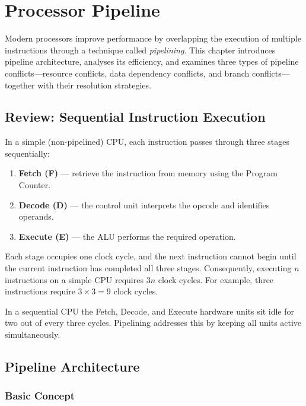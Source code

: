 \documentclass[11pt, a4paper, notitlepage]{report}
\theoremstyle{definition}
\theoremstyle{remark}
\theoremstyle{definition}
\begin{document}
\chapter{Processor Pipeline}
\label{chap:pipeline}

Modern processors improve performance by overlapping the execution of multiple instructions through a technique called \emph{pipelining}. This chapter introduces pipeline architecture, analyses its efficiency, and examines three types of pipeline conflicts---resource conflicts, data dependency conflicts, and branch conflicts---together with their resolution strategies.

\section{Review: Sequential Instruction Execution}
\label{sec:seq-execution}

In a simple (non-pipelined) CPU, each instruction passes through three stages sequentially:

\begin{enumerate}
  \item \textbf{Fetch (F)} --- retrieve the instruction from memory using the Program Counter.
  \item \textbf{Decode (D)} --- the control unit interprets the opcode and identifies operands.
  \item \textbf{Execute (E)} --- the ALU performs the required operation.
\end{enumerate}

Each stage occupies one clock cycle, and the next instruction cannot begin until the current instruction has completed all three stages. Consequently, executing $n$ instructions on a simple CPU requires $3n$ clock cycles. For example, three instructions require $3 \times 3 = 9$ clock cycles.

\begin{warning}[title={Warning: Sequential Bottleneck}]
  In a sequential CPU the Fetch, Decode, and Execute hardware units sit idle for two out of every three cycles. Pipelining addresses this by keeping all units active simultaneously.
\end{warning}

\section{Pipeline Architecture}
\label{sec:pipeline-arch}

\subsection{Basic Concept}
\label{sec:pipeline-concept}
\end{document}
